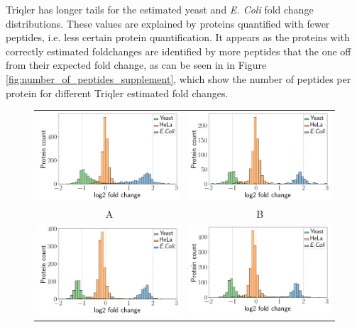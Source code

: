 \documentclass[10pt,letterpaper]{article}
\begin{document}
Triqler has longer tails for the estimated yeast and {\em E. Coli} fold change distributions. These values are explained by proteins quantified with fewer peptides, i.e. less certain protein quantification. It appears as the proteins with correctly estimated foldchanges are identified by more peptides that the one off from their expected fold change, as can be seen in in Figure \ref{fig:number_of_peptides_supplement}, which show the number of peptides per protein for different Triqler estimated fold changes.


\begin{figure}[hbt]
    \centering
    \begin{tabular}{cc}
	    \includegraphics[width=0.4\linewidth]{../../result/report_plots_pipeline/histogram_ID_triqler.png} & 
	    \includegraphics[width=0.4\linewidth]{../../result/report_plots_pipeline/histogram_ID_top3.png} \\ 
        A & B \\ 
	    \includegraphics[width=0.4\linewidth]{../../result/report_plots_pipeline/histogram_ID_msstats.png} & 
	    \includegraphics[width=0.4\linewidth]{../../result/report_plots_pipeline/histogram_ID_msqrob2.png} \\

\end{tabular}
\end{figure}
\end{document}
